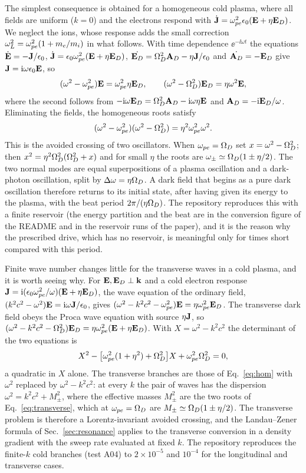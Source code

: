 The simplest consequence is obtained for a homogeneous cold plasma, where all fields are uniform ($k=0$) and the electrons respond with $\dot{\mathbf J}=\omega_{pe}^2\epsilon_0(\mathbf E+\eta\mathbf E_D)$. We neglect the ions, whose response adds the small correction $\omega_L^2=\omega_{pe}^2(1+m_e/m_i)$ in what follows. With time dependence $\ee^{-\ii\omega t}$ the equations $\dot{\mathbf E}=-\mathbf J/\epsilon_0$, $\dot{\mathbf J}=\epsilon_0\omega_{pe}^2(\mathbf E+\eta\mathbf E_D)$, $\dot{\mathbf E_D}=\Omega_D^2\mathbf A_D-\eta\mathbf J/\epsilon_0$ and $\dot{\mathbf A_D}=-\mathbf E_D$ give $\mathbf J=\mathrm{i}\omega\epsilon_0\mathbf E$, so
\begin{equation}
(\omega^2-\omega_{pe}^2)\mathbf E=\omega_{pe}^2\eta\mathbf E_D ,\qquad (\omega^2-\Omega_D^2)\mathbf E_D=\eta\omega^2\mathbf E ,
\end{equation}
where the second follows from $-\mathrm{i}\omega\mathbf E_D=\Omega_D^2\mathbf A_D-\mathrm{i}\omega\eta\mathbf E$ and $\mathbf A_D=-\mathrm{i}\mathbf E_D/\omega$. Eliminating the fields, the homogeneous roots satisfy
\begin{equation}
(\omega^2-\omega_{pe}^2)(\omega^2-\Omega_D^2)=\eta^2\omega_{pe}^2\omega^2 .\label{eq:hom}
\end{equation}
This is the avoided crossing of two oscillators. When $\omega_{pe}=\Omega_D$ set $x=\omega^2-\Omega_D^2$; then $x^2=\eta^2\Omega_D^2(\Omega_D^2+x)$ and for small $\eta$ the roots are $\omega_\pm\simeq\Omega_D(1\pm\eta/2)$. The two normal modes are equal superpositions of a plasma oscillation and a dark-photon oscillation, split by $\Delta\omega=\eta\Omega_D$. A dark field that begins as a pure dark oscillation therefore returns to its initial state, after having given its energy to the plasma, with the beat period $2\pi/(\eta\Omega_D)$. The repository reproduces this with a finite reservoir (the energy partition and the beat are in the conversion figure of the README and in the reservoir runs of the paper), and it is the reason why the prescribed drive, which has no reservoir, is meaningful only for times short compared with this period.

Finite wave number changes little for the transverse waves in a cold plasma, and it is worth seeing why. For $\mathbf E,\mathbf E_D\perp\mathbf k$ and a cold electron response $\mathbf J=\mathrm{i}(\epsilon_0\omega_{pe}^2/\omega)(\mathbf E+\eta\mathbf E_D)$, the wave equation of the ordinary field, $(k^2c^2-\omega^2)\mathbf E=\mathrm{i}\omega\mathbf J/\epsilon_0$, gives $(\omega^2-k^2c^2-\omega_{pe}^2)\mathbf E=\eta\omega_{pe}^2\mathbf E_D$. The transverse dark field obeys the Proca wave equation with source $\eta\mathbf J$, so $(\omega^2-k^2c^2-\Omega_D^2)\mathbf E_D=\eta\omega_{pe}^2(\mathbf E+\eta\mathbf E_D)$. With $X=\omega^2-k^2c^2$ the determinant of the two equations is
\begin{equation}
X^2-\big[\omega_{pe}^2(1+\eta^2)+\Omega_D^2\big]X+\omega_{pe}^2\Omega_D^2=0 ,\label{eq:transverse}
\end{equation}
a quadratic in $X$ alone. The transverse branches are those of Eq.~\eqref{eq:hom} with $\omega^2$ replaced by $\omega^2-k^2c^2$: at every $k$ the pair of waves has the dispersion $\omega^2=k^2c^2+M_\pm^2$, where the effective masses $M_\pm^2$ are the two roots of Eq.~\eqref{eq:transverse}, which at $\omega_{pe}=\Omega_D$ are $M_\pm\simeq\Omega_D(1\pm\eta/2)$. The transverse problem is therefore a Lorentz-invariant avoided crossing, and the Landau--Zener formula of Sec.~\ref{sec:resonance} applies to the transverse conversion in a density gradient with the sweep rate evaluated at fixed $k$. The repository reproduces the finite-$k$ cold branches (test A04) to $2\times10^{-5}$ and $10^{-4}$ for the longitudinal and transverse cases.

